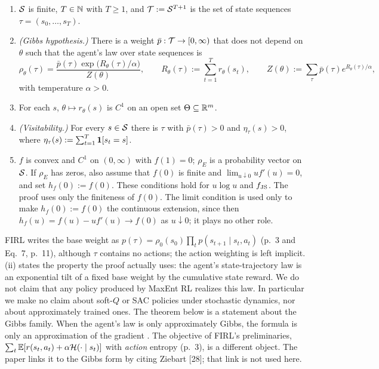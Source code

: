 \begin{assumption}[A-FIRL]\label{ass:firl}
\leavevmode
\begin{enumerate}[nosep,label=(\roman*)]
\item $\mathcal{S}$ is finite, $T\in\mathbb{N}$ with $T\ge1$, and $\mathcal{T}:=\mathcal{S}^{T+1}$ is the set of state sequences $\tau=(s_0,\dots,s_T)$.
\item \emph{(Gibbs hypothesis.)} There is a weight $\bar p:\mathcal{T}\to[0,\infty)$ that does not depend on $\theta$ such that the agent's law over state sequences is
\[
\rho_\theta(\tau)=\frac{\bar p(\tau)\exp\big(R_\theta(\tau)/\alpha\big)}{Z(\theta)},\qquad
R_\theta(\tau):=\sum_{t=1}^Tr_\theta(s_t),\qquad
Z(\theta):=\sum_{\tau}\bar p(\tau)e^{R_\theta(\tau)/\alpha},
\]
with temperature $\alpha>0$.
\item For each $s$, $\theta\mapsto r_\theta(s)$ is $C^1$ on an open set $\Theta\subseteq\mathbb{R}^m$.
\item \emph{(Visitability.)} For every $s\in\mathcal{S}$ there is $\tau$ with $\bar p(\tau)>0$ and $\eta_\tau(s)>0$, where $\eta_\tau(s):=\sum_{t=1}^T\mathbf{1}[s_t=s]$.
\item $f$ is convex and $C^1$ on $(0,\infty)$ with $f(1)=0$; $\rho_E$ is a probability vector on $\mathcal{S}$.
  If $\rho_E$ has zeros, also assume that $f(0)$ is finite and $\lim_{u\downarrow0}uf'(u)=0$, and set $h_f(0):=f(0)$. These conditions hold for $u\log u$ and $f_{\mathrm{JS}}$.
  The proof uses only the finiteness of $f(0)$. The limit condition is used only to make $h_f(0):=f(0)$ the continuous extension, since then $h_f(u)=f(u)-uf'(u)\to f(0)$ as $u\downarrow0$; it plays no other role.
\end{enumerate}
\end{assumption}

\begin{remark}\label{rem:firl-gibbs}
FIRL writes the base weight as $p(\tau)=\rho_0(s_0)\prod_tp(s_{t+1}\mid s_t,a_t)$ (p.~3 and Eq.~7, p.~11), although $\tau$ contains no actions; the action weighting is left implicit.
(ii) states the property the proof actually uses: the agent's state-trajectory law is an exponential tilt of a fixed base weight by the cumulative state reward.
We do not claim that any policy produced by MaxEnt RL realizes this law. In particular we make no claim about soft-$Q$ or SAC policies under stochastic dynamics, nor about approximately trained ones.
The theorem below is a statement about the Gibbs family. When the agent's law is only approximately Gibbs, the formula is only an approximation of the gradient .
The objective of FIRL's preliminaries, $\sum_t\mathbb{E}[r(s_t,a_t)+\alpha\mathcal{H}(\cdot\mid s_t)]$ with \emph{action} entropy (p.~3), is a different object. The paper links it to the Gibbs form by citing Ziebart [28]; that link is not used here.
\end{remark}

